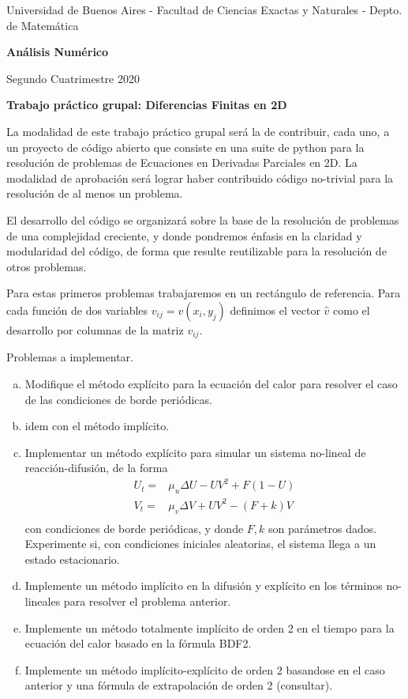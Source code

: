 \documentclass[12pt]{article}
\begin{document}
\centerline{{\small Universidad de Buenos Aires - Facultad de Ciencias Exactas y Naturales - Depto. de Matemática}}
 
 \vskip 0.2cm
 \hrulefill
 \vskip 0.2cm

 \centerline{{\bf\Huge {\sc Análisis Numérico}}}
 \vskip 0.2cm
 \centerline{\ttfamily Segundo Cuatrimestre 2020}
 \hrulefill

 \bigskip
 \centerline{\bf Trabajo práctico grupal: Diferencias Finitas en 2D}
 \bigskip
 
La modalidad de este trabajo práctico grupal será la de contribuir, cada uno, a un proyecto de código abierto que consiste en una suite de python para la resolución de problemas de Ecuaciones en Derivadas Parciales en 2D. La modalidad de aprobación será lograr haber contribuido código no-trivial para la resolución de al menos un problema.

El desarrollo del código se organizará sobre la base de la resolución de problemas de una complejidad creciente, y donde pondremos énfasis en la claridad y modularidad del código, de forma que resulte reutilizable para la resolución de otros problemas. 

Para estas primeros problemas trabajaremos en un rectángulo de referencia. Para cada función de dos variables $v_{ij}=v(x_i,y_j)$ definimos el vector $\hat{v}$ como el desarrollo por columnas de la matriz $v_{ij}$.

Problemas a implementar. 
\begin{enumerate}[(a)]
 \item Modifique el método explícito para la ecuación del calor para resolver el caso de las condiciones de borde periódicas.
 
 \item idem con el método implícito.
 
 \item Implementar un método explícito para simular un sistema no-lineal de reacción-difusión, de la forma
 \begin{equation*}
  \begin{array}{cc}
   U_t = & \mu_u \Delta U - UV^2 + F(1-U) \\
   V_t = & \mu_v \Delta V + UV^2 - (F+k)V\\
  \end{array}
 \end{equation*}
 con condiciones de borde periódicas, y donde $F,k$ son parámetros dados. Experimente si, con condiciones iniciales aleatorias, el sistema llega a un estado estacionario. 
 
 \item Implemente un método implícito en la difusión y explícito en los términos no-lineales para resolver el problema anterior.
 
 \item Implemente un método totalmente implícito de orden 2 en el tiempo para la ecuación del calor basado en la fórmula BDF2.
 
 \item Implemente un método implícito-explícito de orden 2 basandose en el caso anterior y una fórmula de extrapolación de orden 2 (consultar).
\end{enumerate}
\end{document}
